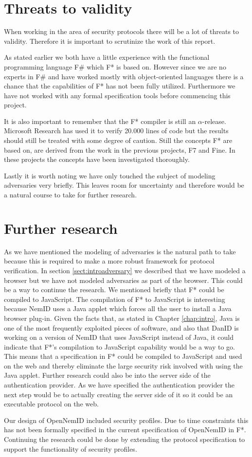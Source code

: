 \documentclass[twosided]{report}
\begin{document}
\section{Threats to validity}
When working in the area of security protocols there will be a lot of threats to validity. Therefore it is important to scrutinize the work of this report.
\par
As stated earlier we both have a little experience with the functional programming language F\# which F* is based on. However since we are no experts in F\# and have worked mostly with object-oriented languages there is a chance that the capabilities of F* has not been fully utilized. Furthermore we have not worked with any formal specification tools before commencing this project.
\par
It is also important to remember that the F* compiler is still an $\alpha$-release. Microsoft Research has used it to verify 20.000 lines of code \cite{fstar-msr} but the results should still be treated with some degree of caution. Still the concepts F* are based on, are derived from the work in the previous projects, F7 and Fine. In these projects the concepts have been investigated thoroughly.
\par
Lastly it is worth noting we have only touched the subject of modeling adversaries very briefly. This leaves room for uncertainty and therefore would be a natural course to take for further research.

\section{Further research}
As we have mentioned the modeling of adversaries is the natural path to take because this is required to make a more robust framework for protocol verification. In section \ref{sect:introadversary} we described that we have modeled a browser but we have not modeled adversaries as part of the browser. This could be a way to continue the research. We mentioned briefly that F* could be compiled to JavaScript. The compilation of F* to JavaScript is interesting because NemID uses a Java applet which forces all the user to install a Java browser plug-in. Given the facts that, as stated in Chapter \ref{chap:intro}, Java is one of the most frequently exploited pieces of software, and also that DanID is working on a version of NemID that uses JavaScript instead of Java, it could indicate that F*'s compilation to JavaScript capability would be a way to go. This means that a specification in F* could be compiled to JavaScript and used on the web and thereby eliminate the large security risk involved with using the Java applet. Further research could also be into the server side of the authentication provider. As we have specified the authentication provider the next step would be to actually creating the server side of it so it could be an executable protocol on the web.
\par
Our design of OpenNemID included security profiles. Due to time constraints this has not been formally specified in the current specification of OpenNemID in F*. Continuing the research could be done by extending the protocol specification to support the functionality of security profiles.
\end{document}
